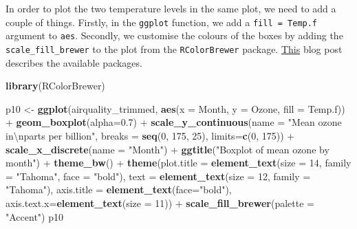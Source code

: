 \documentclass[]{article}
\newenvironment{Shaded}{\begin{snugshade}}{\end{snugshade}}
\newcommand{\KeywordTok}[1]{\textcolor[rgb]{0.13,0.29,0.53}{\textbf{{#1}}}}
\newcommand{\DataTypeTok}[1]{\textcolor[rgb]{0.13,0.29,0.53}{{#1}}}
\newcommand{\DecValTok}[1]{\textcolor[rgb]{0.00,0.00,0.81}{{#1}}}
\newcommand{\FloatTok}[1]{\textcolor[rgb]{0.00,0.00,0.81}{{#1}}}
\newcommand{\CharTok}[1]{\textcolor[rgb]{0.31,0.60,0.02}{{#1}}}
\newcommand{\StringTok}[1]{\textcolor[rgb]{0.31,0.60,0.02}{{#1}}}
\newcommand{\NormalTok}[1]{{#1}}
\begin{document}
In order to plot the two temperature levels in the same plot, we need to
add a couple of things. Firstly, in the \texttt{ggplot} function, we add
a \texttt{fill\ =\ Temp.f} argument to \texttt{aes}. Secondly, we
customise the colours of the boxes by adding the
\texttt{scale\_fill\_brewer} to the plot from the \texttt{RColorBrewer}
package.
\href{http://moderndata.plot.ly/create-colorful-graphs-in-r-with-rcolorbrewer-and-plotly/}{This}
blog post describes the available packages.

\begin{Shaded}
\begin{Highlighting}[]
\KeywordTok{library}\NormalTok{(RColorBrewer)}

\NormalTok{p10 <-}\StringTok{ }\KeywordTok{ggplot}\NormalTok{(airquality_trimmed, }\KeywordTok{aes}\NormalTok{(}\DataTypeTok{x =} \NormalTok{Month, }\DataTypeTok{y =} \NormalTok{Ozone, }\DataTypeTok{fill =} \NormalTok{Temp.f)) +}\StringTok{ }
\StringTok{        }\KeywordTok{geom_boxplot}\NormalTok{(}\DataTypeTok{alpha=}\FloatTok{0.7}\NormalTok{) +}
\StringTok{        }\KeywordTok{scale_y_continuous}\NormalTok{(}\DataTypeTok{name =} \StringTok{"Mean ozone in}\CharTok{\textbackslash{}n}\StringTok{parts per billion"}\NormalTok{,}
                           \DataTypeTok{breaks =} \KeywordTok{seq}\NormalTok{(}\DecValTok{0}\NormalTok{, }\DecValTok{175}\NormalTok{, }\DecValTok{25}\NormalTok{),}
                           \DataTypeTok{limits=}\KeywordTok{c}\NormalTok{(}\DecValTok{0}\NormalTok{, }\DecValTok{175}\NormalTok{)) +}
\StringTok{        }\KeywordTok{scale_x_discrete}\NormalTok{(}\DataTypeTok{name =} \StringTok{"Month"}\NormalTok{) +}
\StringTok{        }\KeywordTok{ggtitle}\NormalTok{(}\StringTok{"Boxplot of mean ozone by month"}\NormalTok{) +}
\StringTok{        }\KeywordTok{theme_bw}\NormalTok{() +}
\StringTok{        }\KeywordTok{theme}\NormalTok{(}\DataTypeTok{plot.title =} \KeywordTok{element_text}\NormalTok{(}\DataTypeTok{size =} \DecValTok{14}\NormalTok{, }\DataTypeTok{family =} \StringTok{"Tahoma"}\NormalTok{, }\DataTypeTok{face =} \StringTok{"bold"}\NormalTok{), }
              \DataTypeTok{text =} \KeywordTok{element_text}\NormalTok{(}\DataTypeTok{size =} \DecValTok{12}\NormalTok{, }\DataTypeTok{family =} \StringTok{"Tahoma"}\NormalTok{),}
              \DataTypeTok{axis.title =} \KeywordTok{element_text}\NormalTok{(}\DataTypeTok{face=}\StringTok{"bold"}\NormalTok{),}
              \DataTypeTok{axis.text.x=}\KeywordTok{element_text}\NormalTok{(}\DataTypeTok{size =} \DecValTok{11}\NormalTok{)) +}
\StringTok{        }\KeywordTok{scale_fill_brewer}\NormalTok{(}\DataTypeTok{palette =} \StringTok{"Accent"}\NormalTok{)}
\NormalTok{p10}
\end{Highlighting}
\end{Shaded}
\end{document}
